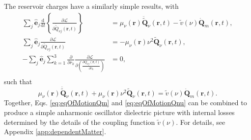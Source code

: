\documentclass{article}
\begin{document}
The reservoir charges have a similarly simple results, with
\begin{equation}
\begin{split}
\sum_j\hat{\mathbf{e}}_j\frac{\mathrm{d}}{\mathrm{d}t}\left\{\frac{\partial \mathcal{L}}{\partial \dot{\tilde{Q}}_{\nu j}(\mathbf{r},t)}\right\} &= \mu_\nu(\mathbf{r})\ddot{\tilde{\mathbf{Q}}}_\nu(\mathbf{r},t) - \tilde{v}(\nu)\dot{\mathbf{Q}}_m(\mathbf{r},t),\\
\sum_j\hat{\mathbf{e}}_j\frac{\partial \mathcal{L}}{\partial \tilde{Q}_{\nu j}(\mathbf{r},t)} &= -\mu_\nu(\mathbf{r})\nu^2\tilde{\mathbf{Q}}_\nu(\mathbf{r},t),\\
-\sum_j\hat{\mathbf{e}}_j\sum_{k = 1}^3\frac{\partial}{\partial r_k}\frac{\partial \mathcal{L}}{\partial\!\left(\frac{\partial Q_{\nu j}(\mathbf{r},t)}{\partial r_k}\right)} &= 0,\\
\end{split}
\end{equation}
such that
\begin{equation}\label{eq:eqOfMotionQnu}
\mu_\nu(\mathbf{r})\ddot{\tilde{\mathbf{Q}}}_\nu(\mathbf{r},t) + \mu_\nu(\mathbf{r})\nu^2\tilde{\mathbf{Q}}_\nu(\mathbf{r},t) = \tilde{v}(\nu)\dot{\mathbf{Q}}_m(\mathbf{r},t).
\end{equation}
Together, Eqs. \eqref{eq:eqOfMotionQm} and \eqref{eq:eqOfMotionQnu} can be combined to produce a simple anharmonic oscillator dielectric picture with internal losses determined by the details of the coupling function $\tilde{v}(\nu)$. For details, see Appendix \ref{app:dependentMatter}.
\end{document}
